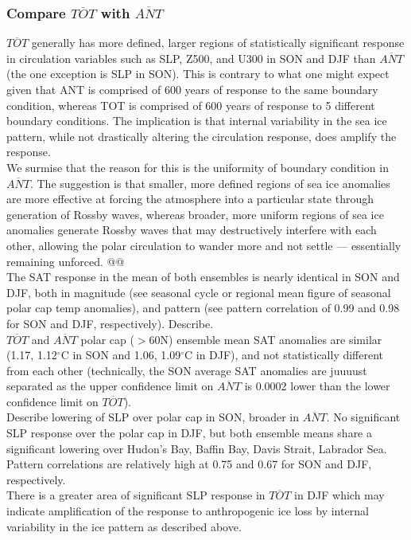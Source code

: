 \documentclass[twocol]{ametsoc}
\begin{document}
\subsubsection{Compare $\overline{TOT}$ with $\overline{ANT}$}

$\overline{TOT}$ generally has more defined, larger regions of statistically significant response in circulation variables such as SLP, Z500, and U300 in SON and DJF than $\overline{ANT}$ (the one exception is SLP in SON). This is contrary to what one might expect given that ANT is comprised of 600 years of response to the same boundary condition, whereas TOT is comprised of 600 years of response to 5 different boundary conditions. The implication is that internal variability in the sea ice pattern, while not drastically altering the circulation response, does amplify the response.\\

We surmise that the reason for this is the uniformity of boundary condition in $\overline{ANT}$. The suggestion is that smaller, more defined regions of sea ice anomalies are more effective at forcing the atmosphere into a particular state through generation of Rossby waves, whereas broader, more uniform regions of sea ice anomalies generate Rossby waves that may destructively interfere with each other, allowing the polar circulation to wander more and not settle --- essentially remaining unforced. @@\\

The SAT response in the mean of both ensembles is nearly identical in SON and DJF, both in magnitude (see seasonal cycle or regional mean figure of seasonal polar cap temp anomalies), and pattern (see pattern correlation of 0.99 and 0.98 for SON and DJF, respectively). Describe.\\
$\overline{TOT}$ and $\overline{ANT}$ polar cap ($>$60N) ensemble mean SAT anomalies are similar (1.17, 1.12$^\circ$C in SON and 1.06, 1.09$^\circ$C in DJF), and not statistically different from each other (technically, the SON average SAT anomalies are juuuust separated as the upper confidence limit on $\overline{ANT}$ is 0.0002 lower than the lower confidence limit on $\overline{TOT}$).\\ 

Describe lowering of SLP over polar cap in SON, broader in $\overline{ANT}$. No significant SLP response over the polar cap in DJF, but both ensemble means share a significant lowering over Hudon's Bay, Baffin Bay, Davis Strait, Labrador Sea. Pattern correlations are relatively high at 0.75 and 0.67 for SON and DJF, respectively.\\
There is a greater area of significant SLP response in $\overline{TOT}$ in DJF which may indicate amplification of the response to anthropogenic ice loss by internal variability in the ice pattern as described above.\\
\end{document}
